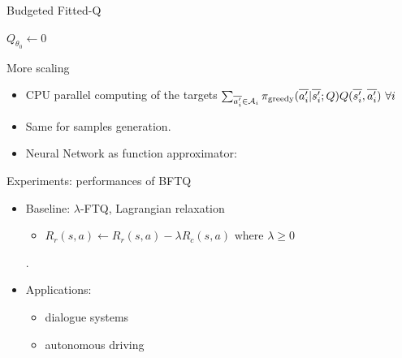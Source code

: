 \documentclass{beamer}
\begin{document}
    \begin{frame}{Budgeted Fitted-Q}
        \begin{algorithm}[H]
            \DontPrintSemicolon
            \KwData{$\cD$}
            $Q_{\theta_0} \leftarrow 0$\;
            \caption{Budgeted Fitted-Q Iteration}
        \end{algorithm}
    \end{frame}

    \begin{frame}{More scaling}

        \begin{itemize}
            \pause\item CPU parallel computing of the targets $\sum_{\ov{a'_i}\in \cA_i} \pi_\text{greedy}(\ov{a'_i}|\ov{s'_i}; Q) Q(\ov{s'_i}, \ov{a'_i})\ \forall i$
            \pause\item Same for samples generation.
            \pause\item Neural Network as function approximator:
        \end{itemize}

        \begin{center}
            \resizebox{.7\textwidth}{!}{%
            
            }
        \end{center}

    \end{frame}




    \begin{frame}{Experiments: performances of BFTQ}
        \begin{itemize}
            \item Baseline: $\lambda$-FTQ, Lagrangian relaxation
            \begin{itemize}
                \item $R_r(s,a) \leftarrow R_r(s,a) - \lambda R_c(s,a) \text{ where } \lambda \geq 0$
            \end{itemize}.
            \item Applications:
            \begin{itemize}
                \item dialogue systems
                \item autonomous driving
            \end{itemize}
        \end{itemize}
    \end{frame}
\end{document}
